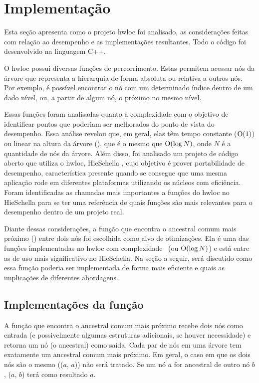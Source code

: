 \chapter{Implementação}

Esta seção apresenta como o projeto hwloc foi analisado, as considerações feitas com relação ao desempenho e as implementações resultantes.
Todo o código foi desenvolvido na linguagem C++.

O hwloc possui diversas funções de percorrimento.
Estas permitem acessar nós da árvore que representa a hierarquia de forma absoluta ou relativa a outros nós.
Por exemplo, é possível encontrar o nó com um determinado índice dentro de um dado nível,
ou, a partir de algum nó, o próximo no mesmo nível.

Essas funções foram analisadas quanto à complexidade com o objetivo de identificar pontos que poderiam ser melhorados do ponto de vista do desempenho.
Essa análise revelou que, em geral, elas têm tempo constante ($\operatorname{O}(1)$) ou linear na altura da árvore (\Oalt), que é o mesmo que $\operatorname{O}(\log N)$, onde $N$ é a quantidade de nós da árvore.
Além disso, foi analisado um projeto de código aberto que utiliza o hwloc, HieSchella \cite{HieSchella},
cujo objetivo é prover portabilidade de desempenho, característica presente quando se consegue que
uma mesma aplicação rode em diferentes plataformas utilizando os núcleos com eficiência.
Foram identificadas as chamadas mais importantes a funções do hwloc no HieSchella para se ter uma referência
de quais funções são mais relevantes para o desempenho dentro de um projeto real.

Diante dessas considerações, a função que encontra o ancestral comum mais próximo (\fACMP) entre dois nós foi escolhida como alvo de otimizações.
Ela é uma das funções implementadas no hwloc com complexidade \Oalt\ (ou $\operatorname{O}(\log N)$) e está entre as de uso mais significativo no HieSchella.
Na seção a seguir, será discutido como essa função poderia ser implementada de forma mais eficiente e quais as implicações de diferentes abordagens.


\section{Implementações da função \fACMP}

A função que encontra o ancestral comum mais próximo recebe dois nós como entrada (e possivelmente algumas estruturas adicionais, se houver necessidade)
e retorna um nó (o ancestral) como saída.
Cada par de nós em uma árvore tem exatamente um ancestral comum mais próximo.
Em geral, o caso em que os dois nós são o mesmo (\fACMP($a$, $a$)) não será tratado.
Se um nó $a$ for ancestral de outro nó $b$, \fACMP($a$, $b$) terá como resultado $a$.


